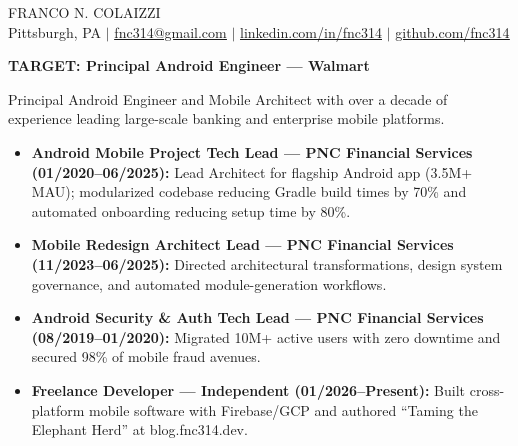 \documentclass[10pt,letterpaper]{article}
\begin{document}
{\ttfamily\Huge\color{color1} FRANCO N. COLAIZZI}\\
Pittsburgh, PA $\mid$ \href{mailto:fnc314@gmail.com}{\uline{fnc314@gmail.com}} $\mid$ \href{https://linkedin.com/in/fnc314}{\uline{linkedin.com/in/fnc314}} $\mid$ \href{https://github.com/fnc314}{\uline{github.com/fnc314}}

{\ttfamily\large\bfseries\color{color1} TARGET: Principal Android Engineer --- Walmart}

Principal Android Engineer and Mobile Architect with over a decade of experience leading large-scale banking and enterprise mobile platforms.

\begin{itemize}
\item \textbf{Android Mobile Project Tech Lead --- PNC Financial Services (01/2020--06/2025):} Lead Architect for flagship Android app (3.5M+ MAU); modularized codebase reducing Gradle build times by 70\% and automated onboarding reducing setup time by 80\%.
\item \textbf{Mobile Redesign Architect Lead --- PNC Financial Services (11/2023--06/2025):} Directed architectural transformations, design system governance, and automated module-generation workflows.
\item \textbf{Android Security \& Auth Tech Lead --- PNC Financial Services (08/2019--01/2020):} Migrated 10M+ active users with zero downtime and secured 98\% of mobile fraud avenues.
\item \textbf{Freelance Developer --- Independent (01/2026--Present):} Built cross-platform mobile software with Firebase/GCP and authored ``Taming the Elephant Herd'' at blog.fnc314.dev.
\end{itemize}
\end{document}

